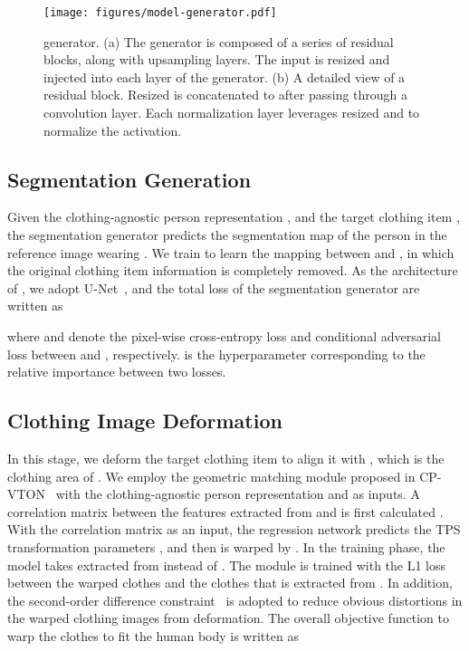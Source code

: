 \begin{figure*}[t!]
    \centering
    \texttt{[image: figures/model-generator.pdf]}
    \vspace{-0.5cm}
    \caption{\norm generator.
    (a) The \norm generator is composed of a series of \norm residual blocks, along with upsampling layers.
    The input  is resized and injected into each layer of the generator.
    (b) A detailed view of a \norm residual block.
    Resized  is concatenated to  after passing through a convolution layer.
    Each \norm normalization layer leverages resized  and  to normalize the activation.
    }
    \vspace{-0.4cm}
    \label{fig:try-on synthesis}
\end{figure*}

\subsection{Segmentation Generation}\label{sec:segmentation}
Given the clothing-agnostic person representation , and the target clothing item , the segmentation generator  predicts the segmentation map  of the person in the reference image wearing .
We train  to learn the mapping between  and , in which the original clothing item information is completely removed.
As the architecture of , we adopt U-Net~\cite{ronneberger2015u}, and the total loss  of the segmentation generator are written as 

where  and  denote the pixel-wise cross-entropy loss and conditional adversarial loss between  and , respectively.  is the hyperparameter corresponding to the relative importance between two losses.

\subsection{Clothing Image Deformation}\label{sec:deformation}
In this stage, we deform the target clothing item  to align it with , which is the clothing area of .
We employ the geometric matching module proposed in CP-VTON~\cite{wang2018toward} with the clothing-agnostic person representation  and  as inputs.
A correlation matrix between the features extracted from  and  is first calculated .
With the correlation matrix as an input, the regression network predicts the TPS transformation parameters , and then  is warped by .
In the training phase, the model takes  extracted from  instead of .
The module is trained with the L1 loss between the warped clothes and the clothes  that is extracted from .
In addition, the second-order difference constraint~\cite{yang2020towards} is adopted to reduce obvious distortions in the warped clothing images from deformation.
The overall objective function to warp the clothes to fit the human body is written as

